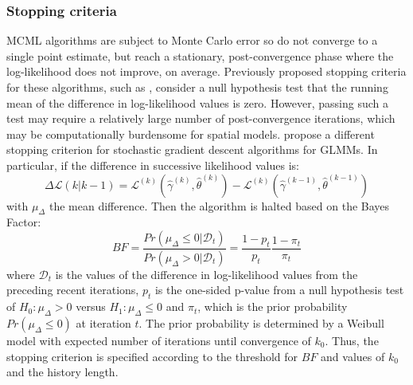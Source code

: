 \subsubsection{Stopping criteria}
MCML algorithms are subject to Monte Carlo error so do not converge to a single point estimate, but reach a stationary, post-convergence phase where the log-likelihood does not improve, on average. Previously proposed stopping criteria for these algorithms, such as \citet{Caffo2005}, consider a null hypothesis test that the running mean of the difference in log-likelihood values is zero. However, passing such a test may require a relatively large number of post-convergence iterations, which may be computationally burdensome for spatial models. \citet{Watson2026} propose a different stopping criterion for stochastic gradient descent algorithms for GLMMs. In particular, if the difference in successive likelihood values is:
\begin{equation*}
    \Delta \mathcal{L}(k | k - 1)  = \mathcal{L}^{(k)}(\hat{\gamma}^{(k)},\hat{\theta}^{(k)}) - \mathcal{L}^{(k)}(\hat{\gamma}^{(k-1)},\hat{\theta}^{(k-1)}) 
\end{equation*}
with $\mu_\Delta$ the mean difference. Then the algorithm is halted based on the Bayes Factor:
\begin{equation*}
    BF = \frac{Pr(\mu_\Delta \leq 0 | \mathcal{D}_t)}{Pr(\mu_\Delta > 0 | \mathcal{D}_t)} = \frac{1 - p_t}{p_t} \frac{1 - \pi_t}{\pi_t}
\end{equation*}
where $\mathcal{D}_t$ is the values of the difference in log-likelihood values from the preceding recent iterations, $p_t$ is the one-sided p-value from a null hypothesis test of $H_0:\mu_\Delta > 0$ versus $H_1:\mu_\Delta \leq 0$ and $\pi_t$, which is the prior probability $Pr(\mu_\Delta \leq 0)$ at iteration $t$. The prior probability is determined by a Weibull model with expected number of iterations until convergence of $k_0$. Thus, the stopping criterion is specified according to the threshold for $BF$ and values of $k_0$ and the history length.

